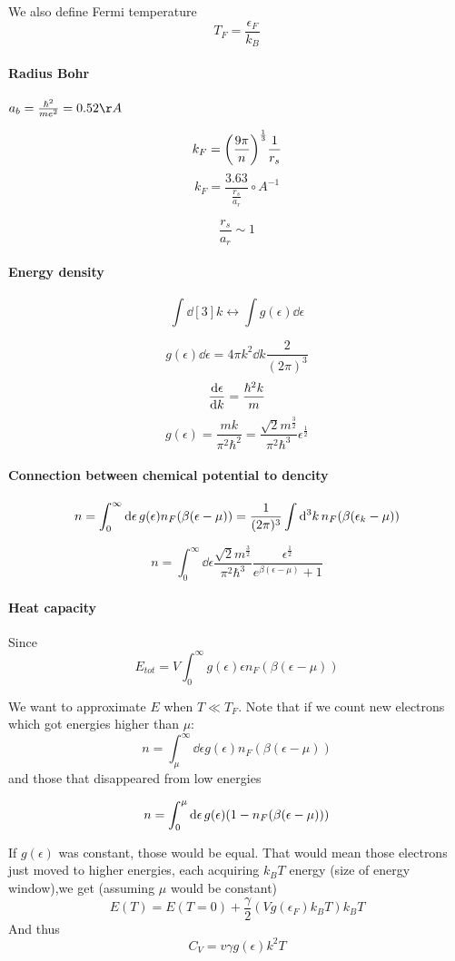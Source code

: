 We also define Fermi temperature
$$T_F = \frac{\epsilon_F}{k_B}$$

\paragraph{Radius Bohr} $a_b = \frac{\hbar^2}{me^2} = 0.52 \AA$

$$k_F = \qty(\frac{9\pi}{n})^{\frac{1}{3}} \frac{1}{r_s}$$
$$k_F = \frac{3.63}{\frac{r_s}{a_r}}\circ{A}^{-1}$$

$$\frac{r_s}{a_r} \sim 1$$

\paragraph{Energy density}
$$\int \dd[3]{k} \leftrightarrow \int g(\epsilon) \dd{\epsilon}$$

$$g(\epsilon) \dd{\epsilon} = 4\pi k^2 \dd{k} \frac{2}{(2\pi)^3}$$
$$\dv{\epsilon}{k} = \frac{\hbar^2 k}{m}$$
$$g(\epsilon) = \frac{mk}{\pi^2 \hbar^2} = \frac{\sqrt{2} m^{\frac{3}{2}}}{\pi^2\hbar^3} \epsilon^{\frac{1}{2}}$$

\paragraph{Connection between chemical potential to dencity}
$$n = \int_0^\infty \dd{\epsilon} g(\epsilon ) n_F(\beta\qty(\epsilon-\mu)) = \frac{1}{(2\pi)^3} \int \dd[3]{k} n_F(\beta\qty(\epsilon_k-\mu))$$

$$n = \int_0^\infty \dd{\epsilon} \frac{\sqrt{2} m^{\frac{3}{2}}}{\pi^2\hbar^3} \frac{\epsilon^{\frac{1}{2}}}{e^{\beta(\epsilon-\mu) } +1}$$

\paragraph{Heat capacity}
Since 
$$E_{tot} = V\int_0^\infty g(\epsilon) \epsilon n_F(\beta(\epsilon-\mu))$$

We want to approximate $E$ when $T\ll T_F$. Note that if we count new electrons which got  energies higher than $\mu$:
$$n = \int_\mu^{\infty} \dd{\epsilon} g(\epsilon) n_F(\beta(\epsilon-\mu))$$
and those that disappeared from low energies

$$n = \int_0^{\mu} \dd{\epsilon} g(\epsilon) \qty(1-n_F(\beta(\epsilon-\mu)))$$

If $g(\epsilon)$ was constant, those would be equal. That would mean those electrons just moved to higher energies, each acquiring $k_BT$ energy (size of energy window),we get  (assuming $\mu$ would be constant) 
$$E(T) = E(T=0) + \frac{\gamma}{2} (V g(\epsilon_F) k_BT)k_BT$$
And thus
$$C_V = v\gamma  g(\epsilon) k^2 T$$